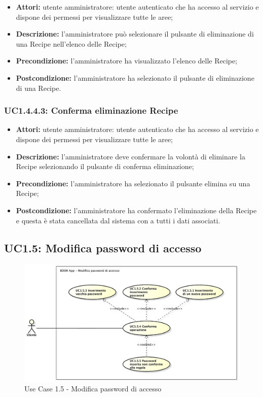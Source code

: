 \begin{itemize}
  	\item \textbf{Attori:} utente amministratore: utente autenticato che ha accesso al servizio e dispone dei permessi per visualizzare tutte le aree;
    \item \textbf{Descrizione:} l'amministratore può selezionare il pulsante di eliminazione di una Recipe nell'elenco delle Recipe;
    \item \textbf{Precondizione:} l'amministratore ha visualizzato l'elenco delle Recipe;
    \item \textbf{Postcondizione:} l'amministratore ha selezionato il pulsante di eliminazione di una Recipe.
\end{itemize}
\subsubsection{UC1.4.4.3: Conferma eliminazione Recipe}

\begin{itemize}
  	\item \textbf{Attori:} utente amministratore: utente autenticato che ha accesso al servizio e dispone dei permessi per visualizzare tutte le aree;
    \item \textbf{Descrizione:} l'amministratore deve confermare la volontà di eliminare la Recipe selezionando il pulsante di conferma eliminazione;
    \item \textbf{Precondizione:} l'amministratore ha selezionato il pulsante elimina su una Recipe;
    \item \textbf{Postcondizione:} l'amministratore ha confermato l'eliminazione della Recipe e questa è stata cancellata dal sistema con a tutti i dati associati.
\end{itemize}

\pagebreak


\subsection{UC1.5: Modifica password di accesso}

\begin{figure}[!htbp]
    \centering
    \centerline{\includegraphics[scale=0.4]{./images/UC1_5.pdf}}
    \caption{Use Case 1.5 - Modifica password di accesso}
\end{figure}

